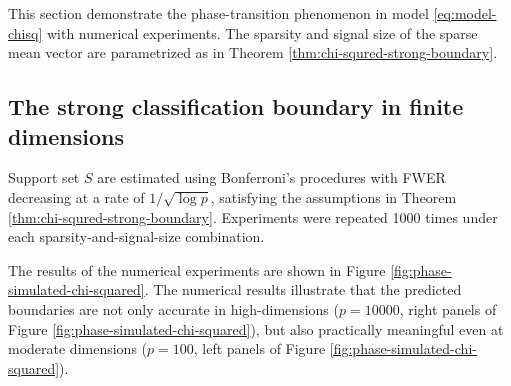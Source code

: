 This section demonstrate the phase-transition phenomenon in model \eqref{eq:model-chisq} with numerical experiments.
The sparsity and signal size of the sparse mean vector are parametrized as in Theorem \ref{thm:chi-squred-strong-boundary}.

\subsection{The strong classification boundary in finite dimensions}

Support set $S$ are estimated using Bonferroni's procedures with FWER decreasing at a rate of $1/\sqrt{\log{p}}$, satisfying the assumptions in Theorem \ref{thm:chi-squred-strong-boundary}.
Experiments were repeated 1000 times under each sparsity-and-signal-size combination.

The results of the numerical experiments are shown in Figure \ref{fig:phase-simulated-chi-squared}.
The numerical results illustrate that the predicted boundaries are not only accurate in high-dimensions ($p=10000$, right panels of Figure \ref{fig:phase-simulated-chi-squared}), but also practically meaningful even at moderate dimensions ($p=100$, left panels of Figure \ref{fig:phase-simulated-chi-squared}).

